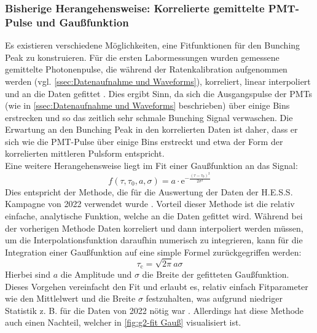\subsubsection{Bisherige Herangehensweise: Korrelierte gemittelte PMT-Pulse und Gaußfunktion}
\label{sssec:Fitfunktion - Bisherige Herangehensweise}
Es existieren verschiedene Möglichkeiten, eine Fitfunktionen für den Bunching Peak zu konstruieren. 
Für die ersten Labormessungen wurden gemessene gemittelte Photonenpulse, die während der Ratenkalibration aufgenommen werden (vgl. \autoref{ssec:Datenaufnahme und Waveforms}), korreliert, linear interpoliert und an die Daten gefittet \cite{zmijaOpticalIntensityInterferometry2021}. 
Dies ergibt Sinn, da sich die Ausgangspulse der PMTs (wie in \autoref{ssec:Datenaufnahme und Waveforms} beschrieben) über einige Bins erstrecken und so das zeitlich sehr schmale Bunching Signal verwaschen. 
Die Erwartung an den Bunching Peak in den korrelierten Daten ist daher, dass er sich wie die PMT-Pulse über einige Bins erstreckt und etwa der Form der korrelierten mittleren Pulsform entspricht. \\
Eine weitere Herangehensweise liegt im Fit einer Gaußfunktion an das Signal:
\begin{equation}
    f(\tau, \tau_0, a, \sigma) = a \cdot \mathrm{e}^{- \frac{\left(\tau-\tau_0\right)^2}{2\sigma^2}}
\end{equation} 
Dies entspricht der Methode, die für die Auswertung der Daten der H.E.S.S. Kampagne von 2022 verwendet wurde \cite{zmijaFirstIntensityInterferometry2023}. 
Vorteil dieser Methode ist die relativ einfache, analytische Funktion, welche an die Daten gefittet wird. 
Während bei der vorherigen Methode Daten korreliert und dann interpoliert werden müssen, um die Interpolationsfunktion daraufhin numerisch zu integrieren, kann für die Integration einer Gaußfunktion auf eine simple Formel zurückgegriffen werden:
\begin{equation}
    \tau_{\mathrm{c}} = \sqrt{2\pi} a\sigma
\end{equation}
Hierbei sind $a$ die Amplitude und $\sigma$ die Breite der gefitteten Gaußfunktion. 
Dieses Vorgehen vereinfacht den Fit und erlaubt es, relativ einfach Fitparameter wie den Mittlelwert und die Breite $\sigma$ festzuhalten, was aufgrund niedriger Statistik z. B. für die Daten von 2022 nötig war \cite{zmijaFirstIntensityInterferometry2023}. 
Allerdings hat diese Methode auch einen Nachteil, welcher in \autoref{fig:g2-fit Gauß} visualisiert ist. 

